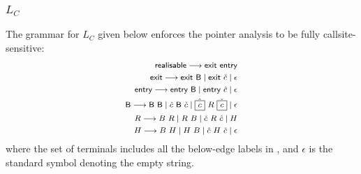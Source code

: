 \subsubsection{$L_C$}
\label{subsubsec:newLC}

The grammar for 
$L_C$ given below enforces the pointer analysis to be fully
callsite-sensitive:
%
\begin{equation}
\label{eqn:callsiteLC}
\footnotesize
    \begin{split}
\textsf{realisable} \longrightarrow \textsf{exit} ~ \textsf{entry} \\
\textsf{exit} \longrightarrow \textsf{exit} ~ \textsf{B} \mid \textsf{exit} \ \check{c} \mid \epsilon \\ 
\textsf{entry} \longrightarrow \textsf{entry} ~ \textsf{B} \mid \textsf{entry} \ \hat{c} \mid \epsilon \\
\textsf{B} \longrightarrow \textsf{B} ~ \textsf{B} \mid \hat{c} ~ \textsf{B} ~ \check{c} \mid \hat{\boxed{c}} ~ R ~ \check{\boxed{c}} \mid \epsilon \\
R \longrightarrow B ~ R \mid R ~ B \mid \check{c} ~ R ~ \hat{c} \mid H\\
H \longrightarrow B ~ H \mid H ~ B \mid \hat{c} ~ H ~ \check{c} \mid \epsilon\\
    \end{split}
\end{equation}
where the set of terminals includes all the below-edge labels in \pag, 
and $\epsilon$ is the standard symbol denoting the empty string. 

